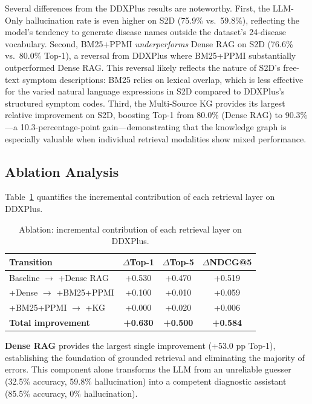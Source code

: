 \documentclass[review]{elsarticle}
\begin{document}
Several differences from the DDXPlus results are noteworthy. First, the LLM-Only hallucination rate is even higher on S2D (75.9\% vs.\ 59.8\%), reflecting the model's tendency to generate disease names outside the dataset's 24-disease vocabulary. Second, BM25+PPMI \emph{underperforms} Dense RAG on S2D (76.6\% vs.\ 80.0\% Top-1), a reversal from DDXPlus where BM25+PPMI substantially outperformed Dense RAG. This reversal likely reflects the nature of S2D's free-text symptom descriptions: BM25 relies on lexical overlap, which is less effective for the varied natural language expressions in S2D compared to DDXPlus's structured symptom codes. Third, the Multi-Source KG provides its largest relative improvement on S2D, boosting Top-1 from 80.0\% (Dense RAG) to 90.3\%---a 10.3-percentage-point gain---demonstrating that the knowledge graph is especially valuable when individual retrieval modalities show mixed performance.

\subsection{Ablation Analysis}
\label{sec:ablation}

Table~\ref{tab:ablation} quantifies the incremental contribution of each retrieval layer on DDXPlus.

\begin{table}[t]
\centering
\caption{Ablation: incremental contribution of each retrieval layer on DDXPlus.}
\label{tab:ablation}
\begin{tabular}{lccc}
\toprule
\textbf{Transition} & \textbf{$\Delta$Top-1} & \textbf{$\Delta$Top-5} & \textbf{$\Delta$NDCG@5} \\
\midrule
Baseline $\to$ +Dense RAG    & +0.530 & +0.470 & +0.519 \\
+Dense $\to$ +BM25+PPMI      & +0.100 & +0.010 & +0.059 \\
+BM25+PPMI $\to$ +KG         & +0.000 & +0.020 & +0.006 \\
\midrule
\textbf{Total improvement}   & \textbf{+0.630} & \textbf{+0.500} & \textbf{+0.584} \\
\bottomrule
\end{tabular}
\end{table}

\textbf{Dense RAG} provides the largest single improvement (+53.0 pp Top-1), establishing the foundation of grounded retrieval and eliminating the majority of errors. This component alone transforms the LLM from an unreliable guesser (32.5\% accuracy, 59.8\% hallucination) into a competent diagnostic assistant (85.5\% accuracy, 0\% hallucination).
\end{document}
